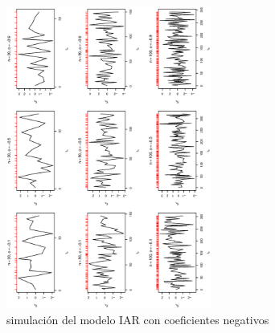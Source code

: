 \begin{figure}[h]
    \includegraphics[width=0.6\textwidth, angle = 270]{Kap3/Fig_Cap3/sim22.eps}
    \caption{simulación del modelo IAR con coeficientes negativos}
    \label{fig:sim2}
\end{figure}